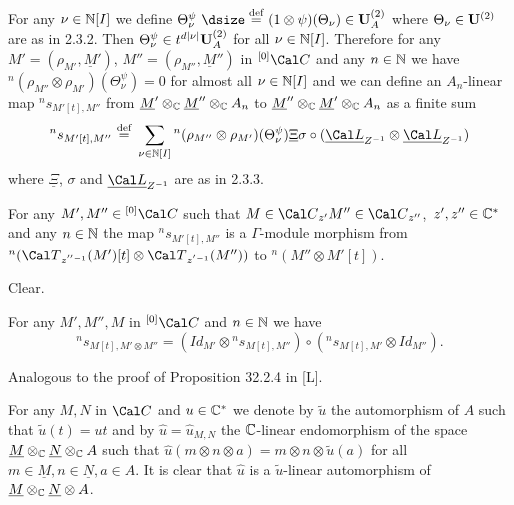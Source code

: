   For any $\nu \in {\Bbb N}[I]$ we define
$\Theta_\nu^\psi\ {\dsize\buildrel{\text{def}}\over =}\ (1 \otimes
\psi)(\Theta_\nu)
\in {\bold U}_A^{(2)}$  where  $\Theta_\nu \in {\bold U}^{(2)}$  are as in
2.3.2.  Then
$\Theta_\nu^\psi \in t^{d|\nu|} {\bold U}_A^{(2)}$  for all $\nu \in {\Bbb
N}[I]$.
Therefore for any  $M' = (\rho_{M'}, \underline{M}')$, $M'' = (\rho_{M''},
\underline{M}'')$  in  ${}^{[0]}{\Cal C}$  and any   $n \in {\Bbb N}$  we have\
${}^n(\rho_{M''} \otimes \rho_{M'})(\Theta_\nu^\psi) = 0$  for almost all
$\nu \in {\Bbb N}[I]$  and we can define an $A_n$-linear map
${}^ns_{M'[t],M''}$  from  $\underline{M}' \otimes_{\Bbb C} \underline{M}''
\otimes_{\Bbb C} A_n$ to $\underline{M}'' \otimes_{\Bbb C} \underline{M}'
\otimes_{\Bbb C} A_n$  as a finite sum
$$
{}^ns_{M'[t],M''}\ {\buildrel{\text{def}}\over =}\ \sum_{\nu\in {\Bbb N}[I]}
{}^n(\rho_{M''} \otimes \rho_{M'})(\Theta^\psi_\nu) \underline{\Xi}
\sigma \circ (\underline{\Cal L}_{Z^{-1}} \otimes \underline{\Cal L}_{Z^{-1}})
$$
where  $\underline{\Xi}$, $\sigma$ and $\underline{\Cal L}_{Z^{-1}}$
are as in 2.3.3.

  For any  $M', M'' \in {}^{[0]}{\Cal C}$
such that  $M \in {\Cal C}_{z'}   M'' \in {\Cal C}_{z''}$,\ $z',z'' \in
{\Bbb C}^*$  and any  $n \in {\Bbb N}$  the map  ${}^ns_{M'[t],M''}$  is
a $\Gamma$-module morphism from  ${}^n({\Cal T}_{z^{''-1}}(M') [t] \otimes
{\Cal T}_{z^{'-1}}(M''))$  to  ${}^n(M'' \otimes M'[t])$.
\endproclaim

  Clear.
\enddemo

  For any  $M', M'', M$  in ${}^{[0]}{\Cal
C}$
and $n \in {\Bbb N}$  we have
$$
{}^ns_{M[t], M'\otimes M''} = (Id_{M'} \otimes {}^ns_{M[t],M''}) \circ
({}^ns_{M[t],M'} \otimes Id_{M''}).
$$
\endproclaim

  Analogous to the proof of Proposition 32.2.4 in [L].
\enddemo

\medpagebreak

  For any  $M, N$ in ${\Cal C}$  and  $u \in {\Bbb C}^*$
we denote by $\widetilde{u}$  the automorphism of $A$ such that
$\widetilde{u}(t)
= ut$  and by $\widehat{u} = \widehat{u}_{M,N}$  the ${\Bbb C}$-linear
endomorphism of the space  $\underline{M} \otimes_{\Bbb C} \underline{N}
\otimes_{\Bbb C} A$  such that $\widehat{u}(m \otimes n \otimes a) =
m \otimes n \otimes \widetilde{u}(a)$  for all $m \in \underline{M},
n \in \underline{N}, a \in A$.  It is clear that  $\widehat{u}$  is a
$\widetilde{u}$-linear automorphism of  $\underline{M} \otimes_{\Bbb C}
\underline{N} \otimes A$.


